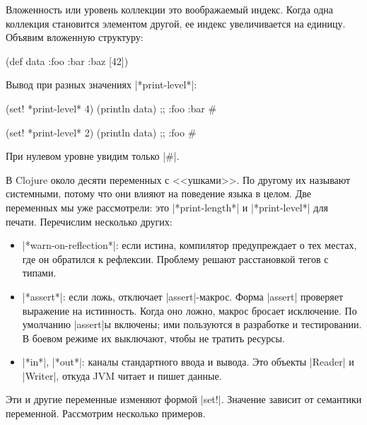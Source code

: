 Вложенность или уровень коллекции это воображаемый индекс. Когда одна коллекция
становится элементом другой, ее индекс увеличивается на единицу. Объявим
вложенную структуру:

\begin{english}
  \begin{clojure}
(def data {:foo {:bar {:baz [42]}}})
  \end{clojure}
\end{english}

\noindent
Вывод при разных значениях \spverb|*print-level*|:

\begin{english}
  \begin{clojure}
(set! *print-level* 4)
(println data)
;; {:foo {:bar #}}

(set! *print-level* 2)
(println data)
;; {:foo #}
  \end{clojure}
\end{english}

\noindent
При нулевом уровне увидим только \spverb|#|.

В Clojure около десяти переменных с <<ушками>>. По другому их называют
системными, потому что они влияют на поведение языка в целом. Две переменных мы
уже рассмотрели: это \spverb|*print-length*| и \spverb|*print-level*| для
печати. Перечислим несколько других:

\begin{itemize}

\item
  \spverb|*warn-on-reflection*|: если истина, компилятор предупреждает о тех
  местах, где он обратился к рефлексии. Проблему решают расстановкой тегов с
  типами.

\item
  \spverb|*assert*|: если ложь, отключает \spverb|assert|-макрос. Форма \spverb|assert|
  проверяет выражение на истинность. Когда оно ложно, макрос бросает исключение.
  По умолчанию \spverb|assert|ы включены; ими пользуются в разработке и тестировании.
  В боевом режиме их выключают, чтобы не тратить ресурсы.

\item
  \spverb|*in*|, \spverb|*out*|: каналы стандартного ввода и вывода. Это объекты
  \spverb|Reader| и \spverb|Writer|, откуда JVM читает и пишет данные.

\end{itemize}

Эти и другие переменные изменяют формой \spverb|set!|. Значение зависит от
семантики переменной. Рассмотрим несколько примеров.

